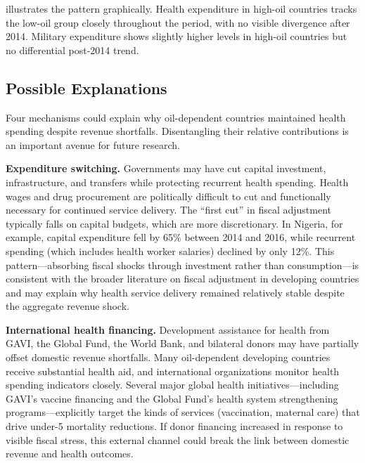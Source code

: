 \documentclass[12pt]{article}
\begin{document}
 illustrates the pattern graphically. Health expenditure in high-oil countries tracks the low-oil group closely throughout the period, with no visible divergence after 2014. Military expenditure shows slightly higher levels in high-oil countries but no differential post-2014 trend.

\subsection{Possible Explanations}

Four mechanisms could explain why oil-dependent countries maintained health spending despite revenue shortfalls. Disentangling their relative contributions is an important avenue for future research.

\textbf{Expenditure switching.} Governments may have cut capital investment, infrastructure, and transfers while protecting recurrent health spending. Health wages and drug procurement are politically difficult to cut and functionally necessary for continued service delivery. The ``first cut'' in fiscal adjustment typically falls on capital budgets, which are more discretionary. In Nigeria, for example, capital expenditure fell by 65\% between 2014 and 2016, while recurrent spending (which includes health worker salaries) declined by only 12\%. This pattern---absorbing fiscal shocks through investment rather than consumption---is consistent with the broader literature on fiscal adjustment in developing countries and may explain why health service delivery remained relatively stable despite the aggregate revenue shock.

\textbf{International health financing.} Development assistance for health from GAVI, the Global Fund, the World Bank, and bilateral donors may have partially offset domestic revenue shortfalls. Many oil-dependent developing countries receive substantial health aid, and international organizations monitor health spending indicators closely. Several major global health initiatives---including GAVI's vaccine financing and the Global Fund's health system strengthening programs---explicitly target the kinds of services (vaccination, maternal care) that drive under-5 mortality reductions. If donor financing increased in response to visible fiscal stress, this external channel could break the link between domestic revenue and health outcomes.
\end{document}
